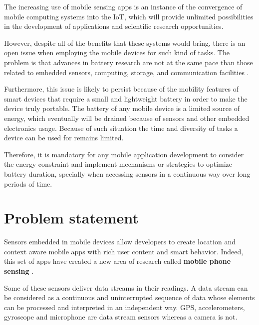 \documentclass{report}
\begin{document}
The increasing use of mobile sensing apps is an instance of the convergence of mobile computing systems into the IoT, which will provide unlimited possibilities in the development of applications and scientific research opportunities.

However, despite all of the benefits that these systems would bring, there is an open issue when employing the mobile devices for such kind of tasks.
The problem is that advances in battery research are not at the same pace than those related to embedded sensors, computing, storage, and communication facilities \citep{Kjaergaard2012}.

Furthermore, this issue is likely to persist because of the mobility features of smart devices that require a small and lightweight battery in order to make the device truly portable.
The battery of any mobile device is a limited source of energy, which eventually will be drained because of sensors and other embedded electronics usage.
Because of such situation the time and diversity of tasks a device can be used for remains limited.

Therefore, it is mandatory for any mobile application development to consider the energy constraint and implement mechanisms or strategies to optimize battery duration, specially when accessing sensors in a continuous way over long periods of time.





\section{Problem statement}
Sensors embedded in mobile devices allow developers to create location and context aware mobile apps with rich user content and smart behavior.
Indeed, this set of apps have created a new area of research called \textbf{mobile phone sensing} \citep{Lane2010}.

Some of these sensors deliver data streams in their readings.
A data stream can be considered as a continuous and uninterrupted sequence of data whose elements can be processed and interpreted in an independent way.
GPS, accelerometers, gyroscope and microphone are data stream sensors whereas a camera is not.
\end{document}
